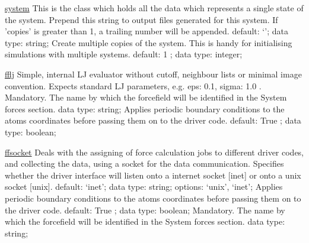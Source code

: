 \begin{ipifield}{}
\begin{ipifield}{\hyperref[SYSTEM]{system}}
{This is the class which holds all the data which represents a single state of the system.}%
{}%
{%
{Prepend this string to output files generated for this system. If 'copies' is greater than 1, a trailing number will be appended.}%
{default: `'; data type: string; }%
%
{Create multiple copies of the system. This is handy for initialising simulations with multiple systems.}%
{default:  1 ; data type: integer; }%
}
\end{ipifield}
\begin{ipifield}{\hyperref[FFLJ]{fflj}}%
{Simple, internal LJ evaluator without cutoff, neighbour lists or minimal image convention.
                   Expects standard LJ parameters, e.g. { eps: 0.1, sigma: 1.0 }. }%
{}%
{%
{Mandatory. The name by which the forcefield will be identified in the System forces section.}%
{data type: string; }%
%
{Applies periodic boundary conditions to the atoms coordinates before passing them on to the driver code.}%
{default:  True ; data type: boolean; }%
}
\end{ipifield}
\begin{ipifield}{\hyperref[FFSOCKET]{ffsocket}}%
{Deals with the assigning of force calculation jobs to different driver codes, and collecting the data, using a socket for the data communication.}%
{}%
{%
{Specifies whether the driver interface will listen onto a internet socket [inet] or onto a unix socket [unix].}%
{default: `inet'; data type: string; options: `unix', `inet'; }%
%
{Applies periodic boundary conditions to the atoms coordinates before passing them on to the driver code.}%
{default:  True ; data type: boolean; }%
%
{Mandatory. The name by which the forcefield will be identified in the System forces section.}%
{data type: string; }%
}
\end{ipifield}
\end{ipifield}
